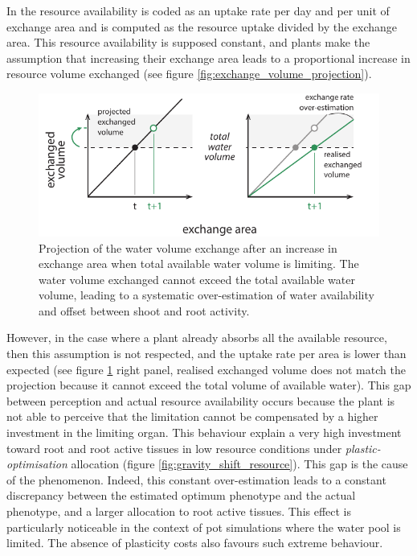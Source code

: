 In \model the resource availability is coded as an uptake rate per day and per unit of exchange area and is computed as the resource uptake divided by the exchange area. This resource availability is supposed constant, and plants make the assumption that increasing their exchange area leads to a proportional increase in resource volume exchanged (see figure \ref{fig:exchange_volume_projection}).

\begin{figure}\label{fig:exhaustion}
\includegraphics[width = \textwidth]{./2_PP/Figures/Concepts/exhaustion2.pdf}
\caption{Projection of the water volume exchange after an increase in exchange area when total available water volume is limiting. The water volume exchanged cannot exceed the total available water volume, leading to a systematic over-estimation of water availability and offset between shoot and root activity.}
\end{figure}

However, in the case where a plant already absorbs all the available resource, then this assumption is not respected, and the uptake rate per area is lower than expected (see figure \ref{fig:exhaustion} right panel, realised exchanged volume does not match the projection because it cannot exceed the total volume of available water). This gap between perception and actual resource availability occurs because the plant is not able to perceive that the limitation cannot be compensated by a higher investment in the limiting organ. This behaviour explain a very high investment toward root and root active tissues in low resource conditions under \textit{plastic-optimisation} allocation (figure \ref{fig:gravity_shift_resource}). This gap is the cause of the  phenomenon. Indeed, this constant over-estimation leads to a constant discrepancy between the estimated optimum phenotype and the actual phenotype, and a larger allocation to root active tissues. This effect is particularly noticeable in the context of pot simulations where the water pool is limited. The absence of plasticity costs also favours such extreme behaviour. 

